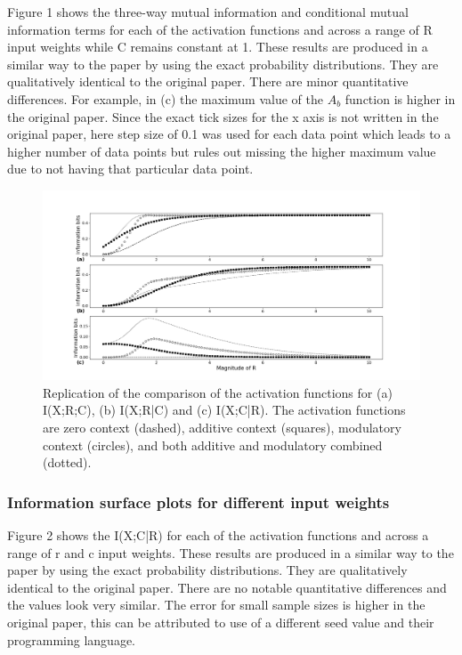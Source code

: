 Figure 1 shows the three-way mutual information and conditional mutual information terms for each of the activation functions and across a range of R input weights while C remains constant at 1. These results are produced in a similar way to the paper by using the exact probability distributions. They are qualitatively identical to the original paper. There are minor quantitative differences. For example, in (c) the maximum value of the $A_b$ function is higher in the original paper. Since the exact tick sizes for the x axis is not written in the original paper, here step size of 0.1 was used for each data point which leads to a higher number of data points but rules out missing the higher maximum value due to not having that particular data point. 

\begin{figure}[H]
    \includegraphics[width=\textwidth]{figure_1.png}
      \caption{Replication of the comparison of the activation functions for (a) I(X;R;C), (b) I(X;R|C) and (c) I(X;C|R). The activation functions are zero context (dashed), additive context (squares), modulatory context (circles), and both additive and modulatory combined (dotted).}
\end{figure}

\subsubsection{Information surface plots for different input weights}

Figure 2 shows the I(X;C|R) for each of the activation functions and across a range of r and c input weights. These results are produced in a similar way to the paper by using the exact probability distributions. They are qualitatively identical to the original paper. There are no notable quantitative differences and the values look very similar. The error for small sample sizes is higher in the original paper, this can be attributed to use of a different seed value and their programming language.


